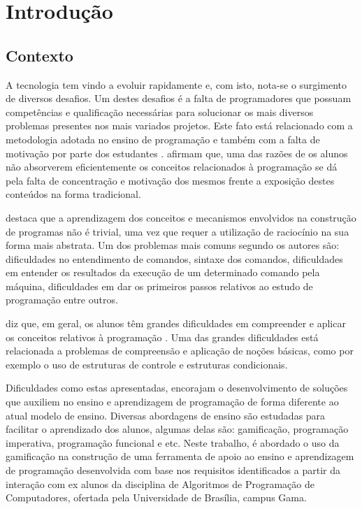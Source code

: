 \chapter[Introdução]{Introdução}

\section{Contexto}
A tecnologia tem vindo a evoluir rapidamente e, com isto, nota-se o surgimento de
diversos desafios. Um destes desafios é a falta de programadores que possuam competências 
e qualificação necessárias para solucionar os mais diversos problemas presentes nos mais
variados projetos. Este fato está relacionado com a metodologia adotada no ensino de
programação e também com a falta de motivação por parte dos estudantes \cite{7975788}.
 afirmam que, uma das razões de os alunos não absorverem eficientemente
os conceitos relacionados à programação se dá pela falta de concentração e motivação dos mesmos frente
a exposição destes conteúdos na forma tradicional.

 destaca que a aprendizagem dos conceitos e mecanismos envolvidos na construção de programas não é
trivial, uma vez que requer a utilização de raciocínio na sua forma mais abstrata. Um dos problemas mais comuns segundo os autores
são: dificuldades no entendimento de comandos, sintaxe dos comandos, dificuldades em entender os resultados da execução de um determinado 
comando pela máquina, dificuldades em dar os primeiros passos relativos ao estudo de programação entre outros.

 diz que, em geral, os alunos têm grandes dificuldades em compreender e aplicar os conceitos relativos à programação . Uma das grandes 
dificuldades está relacionada a problemas de compreensão e aplicação de noções básicas, como por exemplo o uso de estruturas de controle e estruturas
condicionais.

Dificuldades como estas apresentadas, encorajam o desenvolvimento de soluções que auxiliem no ensino e aprendizagem de programação de forma diferente ao
atual modelo de ensino. Diversas abordagens de ensino são estudadas para facilitar o aprendizado dos alunos, algumas delas são:
gamificação, programação imperativa, programação funcional e etc. Neste trabalho, é abordado o uso da gamificação na construção de uma ferramenta
de apoio ao ensino e aprendizagem de programação desenvolvida com base nos requisitos identificados a partir da interação com ex alunos
da disciplina de Algoritmos de Programação de Computadores, ofertada pela Universidade de Brasília, campus Gama.

